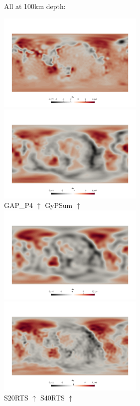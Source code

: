 All at 100km depth:
\begin{center}
\includegraphics[width=7cm]{python_codes/fieldstone_66/images/GAP_P4}
\includegraphics[width=7cm]{python_codes/fieldstone_66/images/GyPSum_S}\\
GAP\_P4 $\uparrow$ \hspace{7cm} GyPSum $\uparrow$ \\
\includegraphics[width=7cm]{python_codes/fieldstone_66/images/S20RTS}
\includegraphics[width=7cm]{python_codes/fieldstone_66/images/S40RTS}\\
S20RTS $\uparrow$ \hspace{7cm} S40RTS $\uparrow$ \\

\end{center}
